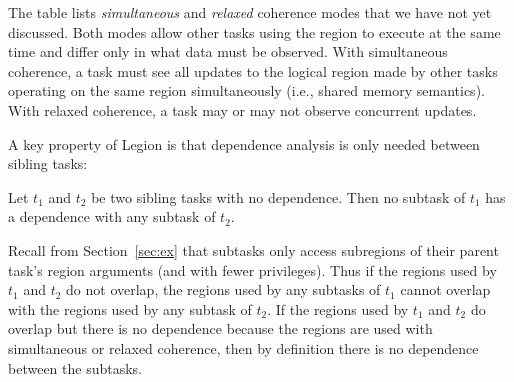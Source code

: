 The table lists {\em simultaneous} and {\em relaxed} coherence modes
that we have not yet discussed.  Both modes
allow other tasks using the region to execute at the same time and differ
only in what data must be observed.  With simultaneous coherence, a task must 
see all updates to the logical region made by other tasks operating on the same region 
simultaneously (i.e., shared memory semantics).  With relaxed coherence, 
a task may or may not observe concurrent updates.


%
%
%
%
%
%
%

A key property of Legion is that dependence analysis is only needed
between sibling tasks:
\begin{observation}
\label{obs:isolation}
\rm
Let $t_1$ and $t_2$ be two sibling tasks with no dependence.  Then no subtask of $t_1$ has a dependence with any subtask
of $t_2$.
\end{observation}
Recall from Section~\ref{sec:ex} that subtasks only access subregions of their parent task's region arguments (and with fewer
privileges).  Thus if the regions used by $t_1$ and $t_2$ do not overlap, the regions used by any subtasks of $t_1$ cannot
overlap with the regions used by any subtask of $t_2$.  If the regions used by $t_1$ and $t_2$ do overlap
but there is no dependence because the regions are used with simultaneous or relaxed coherence, then by definition there is no dependence between the subtasks.

